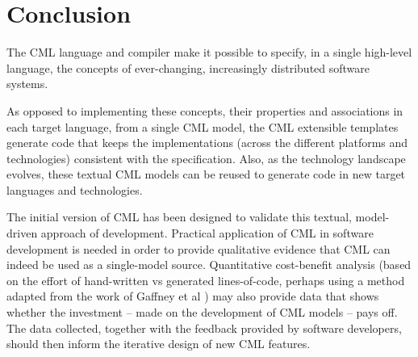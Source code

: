 \section{Conclusion}\label{sec:conclusion}

The CML language and compiler make it possible to specify,
in a single high-level language,
the concepts of ever-changing, increasingly distributed software systems.

As opposed to implementing these concepts, their properties and associations in each target language,
from a single CML model,
the CML extensible templates generate code that
keeps the implementations 
(across the different platforms and technologies) 
consistent with the specification.
Also, as the technology landscape evolves,
these textual CML models can be reused to generate code in new target languages and technologies.

The initial version of CML has been designed to validate this textual, model-driven approach of development.
Practical application of CML in software development is needed in order to provide qualitative evidence that
CML can indeed be used as a single-model source.
Quantitative cost-benefit analysis
(based on the effort of hand-written vs generated lines-of-code, perhaps using a method adapted from the work of Gaffney et al \cite{gaffney})
may also provide data
that shows whether the investment -- made on the development of CML models -- pays off. The data collected, together with the feedback provided by software developers, should then inform the iterative design of new CML features.
